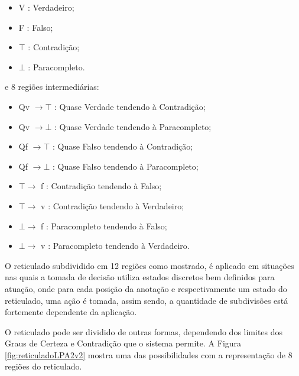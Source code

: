 \begin{itemize}
\item V : Verdadeiro;
\item F : Falso;
\item $\top$ : Contradição;
\item $\bot$ : Paracompleto.
\end{itemize}
e 8 regiões intermediárias: 
\begin{itemize}
\item Qv $\rightarrow  \top$ : Quase Verdade tendendo à Contradição;
\item Qv $\rightarrow  \bot$ : Quase Verdade tendendo à  Paracompleto;
\item Qf $\rightarrow  \top$ : Quase Falso tendendo à Contradição;
\item Qf $\rightarrow  \bot$ : Quase Falso tendendo à Paracompleto;
\item $\top \rightarrow $ f : Contradição tendendo à Falso;
\item $\top \rightarrow $ v : Contradição tendendo à Verdadeiro;
\item $\bot \rightarrow $ f : Paracompleto tendendo à Falso;
\item $\bot \rightarrow $ v : Paracompleto tendendo à Verdadeiro.

\end{itemize}

O reticulado subdividido em 12 regiões como mostrado, é aplicado em situações nas quais a tomada de decisão utiliza estados discretos bem definidos para atuação, onde para cada posição da anotação e respectivamente um estado do reticulado, uma ação é tomada, assim sendo, a quantidade de subdivisões está fortemente dependente da aplicação.


O reticulado pode ser dividido de outras formas, dependendo dos limites dos Graus de Certeza e Contradição que o sistema permite. A Figura \ref{fig:reticuladoLPA2v2} mostra uma das possibilidades com a representação de 8 regiões do reticulado. 


